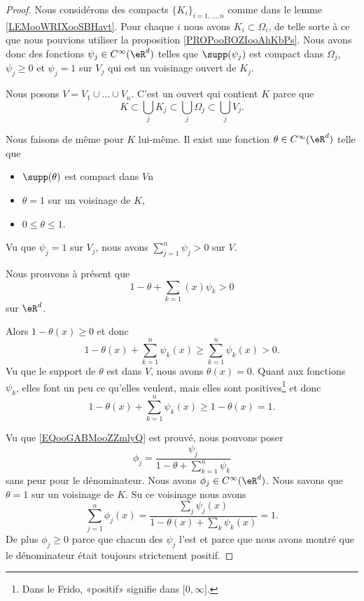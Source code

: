 \begin{proof}
	Nous considérons des compacts \( \{ K_i \}_{i=1,\ldots, n}\) comme dans le lemme \ref{LEMooWRIXooSBHavt}. Pour chaque \( i\) nous avons \( K_i\subset \Omega_i\), de telle sorte à ce que nous pouvions utiliser la proposition \ref{PROPooBOZIooAhKbPs}. Nous avons donc des fonctions \( \psi_j\in  C^{\infty}(\eR^d)\) telles que \( \supp(\psi_j)\) est compact dans \( \Omega_j\), \( \psi_j\geq 0\) et \( \psi_j=1\) sur \( V_j\) qui est un voisinage ouvert de \( K_j\).

	Nous posons \( V=V_1\cup\ldots \cup V_n\). C'est un ouvert qui contient \( K\) parce que
	\begin{equation}
		K\subset \bigcup_jK_j\subset\bigcup_j\Omega_j\subset \bigcup_jV_j.
	\end{equation}

	Nous faisons de même pour \( K\) lui-même. Il exist une fonction \( \theta\in  C^{\infty}(\eR^d)\) telle que
	\begin{itemize}
		\item \( \supp(\theta)\) est compact dans \( V\)n
		\item
		      \( \theta=1\) sur un voisinage de \( K\),
		\item
		      \( 0\leq \theta\leq 1\).
	\end{itemize}
	Vu que \( \psi_j=1\) sur \( V_j\), nous avons \( \sum_{j=1}^n\psi_j>0\) sur \( V\).

	Nous prouvons à présent que
	\begin{equation}        \label{EQooGABMooZZmlyQ}
		1-\theta+\sum_{k=1}(x)\psi_k>0
	\end{equation}
	sur \( \eR^d\).
	\begin{subproof}
		\spitem[Si \( x\in V\)]
		Alors \( 1-\theta(x)\geq 0\) et donc
		\begin{equation}
			1-\theta(x)+\sum_{k=1}^n\psi_k(x)\geq \sum_{k=1}^n\psi_k(x)>0.
		\end{equation}
		\spitem[Si \( x\notin V\)]
		Vu que le support de \( \theta\) est dans \( V\), nous avons \( \theta(x)=0\). Quant aux fonctions \( \psi_k\), elles font un peu ce qu'elles veulent, mais elles sont positives\footnote{Dans le Frido, «positif» signifie dans \( \mathopen[ 0 , \infty \mathclose]\).} et donc
		\begin{equation}
			1-\theta(x)+\sum_{k=1}^n\psi_k(x)\geq 1-\theta(x)=1.
		\end{equation}
	\end{subproof}
	Vu que \eqref{EQooGABMooZZmlyQ} est prouvé, nous pouvons poser
	\begin{equation}
		\phi_j=\frac{ \psi_j }{ 1-\theta+\sum_{k=1}^n\psi_k }
	\end{equation}
	sans peur pour le dénominateur. Nous avons \( \phi_j\in  C^{\infty}(\eR^d)\). Nous savons que \( \theta=1\) sur un voisinage de \( K\). Su ce voisinage nous avons
	\begin{equation}
		\sum_{j=1}^n\phi_j(x)=\frac{ \sum_{j}\psi_j(x) }{ 1-\theta(x)+\sum_k\psi_k(x) }=1.
	\end{equation}
	De plus \( \phi_j\geq 0\) parce que chacun des \( \psi_j\) l'est et parce que nous avons montré que le dénominateur était toujours strictement positif.


\end{proof}
